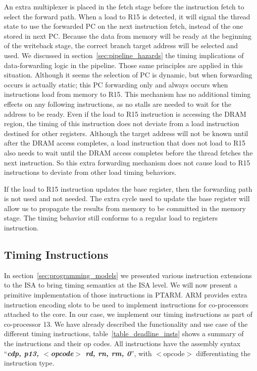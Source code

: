 An extra multiplexer is placed in the fetch stage before the instruction fetch to select the forward path.
When a load to R15 is detected, it will signal the thread state to use the forwarded PC on the next instruction fetch, instead of the one stored in next PC.
Because the data from memory will be ready at the beginning of the writeback stage, the correct branch target address will be selected and used.
We discussed in section~\ref{sec:pipeline_hazards} the timing implications of data-forwarding logic in the pipeline.
Those same principles are applied in this situation.
Although it seems the selection of PC is dynamic, but when forwarding occurs is actually static; this PC forwarding only and always occurs when instructions load from memory to R15.
This mechanism has no additional timing effects on any following instructions, as no stalls are needed to wait for the address to be ready. 
Even if the load to R15 instruction is accessing the DRAM region, the timing of this instruction does not deviate from a load instruction destined for other registers.
Although the target address will not be known until after the DRAM access completes, a load instruction that does not load to R15 also needs to wait until the DRAM access completes before the thread fetches the next instruction. 
So this extra forwarding mechanism does not cause load to R15 instructions to deviate from other load timing behaviors.

If the load to R15 instruction updates the base register, then the forwarding path is not used and not needed. 
The extra cycle used to update the base register will allow us to propagate the results from memory to be committed in the memory stage.
The timing behavior still conforms to a regular load to registers instruction. 

\subsection{Timing Instructions}
\label{sec:timing_inst_implementation}
In section~\ref{sec:programming_models} we presented various instruction extensions to the ISA to bring timing semantics at the ISA level.
We will now present a primitive implementation of those instructions in PTARM.  
ARM provides extra instruction encoding slots to be used to implement instructions for co-processors attached to the core. 
In our case, we implement our timing instructions as part of co-processor 13.
We have already described the functionality and use case of the different timing instructions, table~\ref{table_deadline_insts} shows a summary of the instructions and their op codes.
All instructions have the assembly syntax ``\textbf{\textit{cdp, p13, $<$opcode$>$ rd, rn, rm, 0}}'', with $<$opcode$>$ differentiating the instruction type.
   
